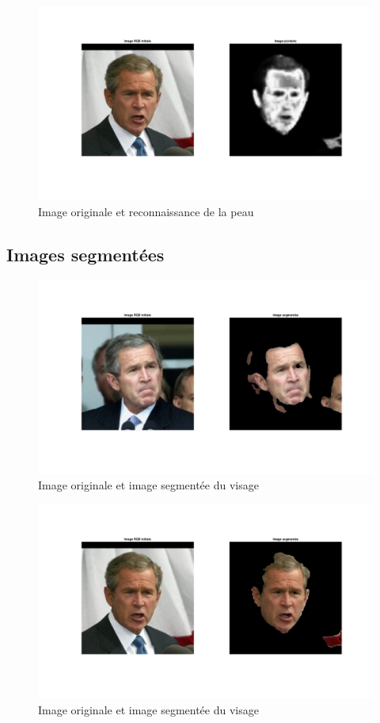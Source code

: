 \documentclass[11pt,a4paper]{article}
\begin{document}
\begin{figure}[H]
\center
\includegraphics[width=12cm]{exo2_skin3.png}
\caption{Image originale et reconnaissance de la peau}

\end{figure}

\subsection{Images segmentées}
\label{an.seg}

\begin{figure}[H]
\center
\includegraphics[width=12cm]{exo2_image_seg2.png}
\caption{Image originale et image segmentée du visage}
\end{figure} 

\begin{figure}[H]
\center
\includegraphics[width=12cm]{exo2_image_seg3.png}
\caption{Image originale et image segmentée du visage}
\end{figure} 
\end{document}
